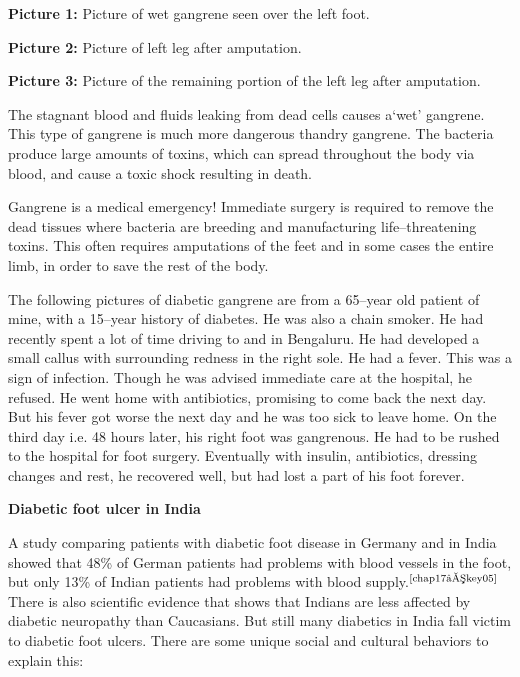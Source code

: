 {\small{
\textbf{Picture 1:} Picture of wet gangrene seen over the left foot.

\textbf{Picture 2:} Picture of left leg after amputation.

\textbf{Picture 3:} Picture of the remaining portion of the left leg after ampu\-tation.}}

The stagnant blood and fluids leaking from dead cells causes a\break ‘wet’ gangrene. This type of gangrene is much more dangerous than\break dry gangrene. The bacteria produce large amounts of toxins, which can spread throughout the body via blood, and cause a toxic shock resu\-lting in death.

Gangrene is a medical emergency! Immediate surgery is required to remove the dead tissues where bacteria are breeding and manu\-fa\-cturing life–threatening toxins. This often requires amputations of the feet and in some cases the entire limb, in order to save the rest of the body.

The following pictures of diabetic gangrene are from a 65–year old patient of mine, with a 15–year history of diabetes. He was also a chain smoker. He had recently spent a lot of time driving to and in Bengaluru. He had developed a small callus with surrounding redness in the right sole. He had a fever. This was a sign of infection. Though he was advi\-sed immediate care at the hospital, he refused. He went home with antibiotics, promising to come back the next day. But his fever got worse the next day and he was too sick to leave home. On the third day i.e. 48 hours later, his right foot was gangrenous. He had to be rushed to the hospital for foot surgery. Eventually with insulin, antibiotics, dressing changes and rest, he recovered well, but had lost a part of his foot forever.

\noindent\textbf{Diabetic foot ulcer in India}

A study comparing patients with diabetic foot disease in Germany and in India showed that 48\% of German patients had pro\-blems with blood vessels in the foot, but only 13\% of Indian patients had problems with blood supply.$^{\text{\cite{chap17–key05}}}$ There is also scientific evidence that shows that Indians are less affected by diabetic neuropathy than Caucasians. But still many diabetics in India fall victim to diabetic foot ulcers. There are some unique social and cultural behaviors to explain this:

\clearpage

